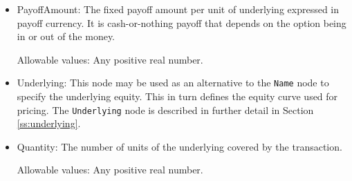 \begin{itemize}
\item PayoffAmount: The fixed payoff amount per unit of underlying expressed in payoff currency. It is cash-or-nothing payoff that depends on the option being in or out of the money.

Allowable values:  Any positive real number.

\item Underlying:  This node may be used as an alternative to the \lstinline!Name! node to specify the underlying equity. This in turn defines the equity curve used for pricing. The \lstinline!Underlying! node is described in further detail in Section \ref{ss:underlying}.

\item Quantity: The number of units of the underlying covered by the transaction. 
    
Allowable values:  Any positive real number.

\end{itemize}
